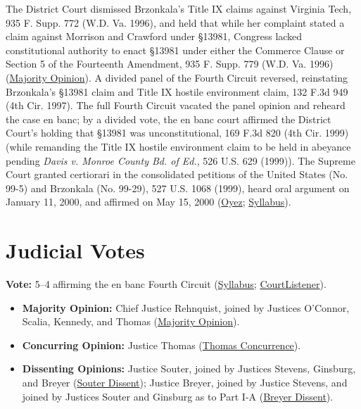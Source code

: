\documentclass[12pt]{article}
\begin{document}
The District Court dismissed Brzonkala's Title IX claims against Virginia Tech, 935 F. Supp. 772 (W.D. Va. 1996), and held that while her complaint stated a claim against Morrison and Crawford under \S 13981, Congress lacked constitutional authority to enact \S 13981 under either the Commerce Clause or Section 5 of the Fourteenth Amendment, 935 F. Supp. 779 (W.D. Va. 1996) (\href{https://www.law.cornell.edu/supct/html/99-5.ZO.html}{Majority Opinion}). A divided panel of the Fourth Circuit reversed, reinstating Brzonkala's \S 13981 claim and Title IX hostile environment claim, 132 F.3d 949 (4th Cir. 1997). The full Fourth Circuit vacated the panel opinion and reheard the case en banc; by a divided vote, the en banc court affirmed the District Court's holding that \S 13981 was unconstitutional, 169 F.3d 820 (4th Cir. 1999) (while remanding the Title IX hostile environment claim to be held in abeyance pending \textit{Davis v. Monroe County Bd. of Ed.}, 526 U.S. 629 (1999)). The Supreme Court granted certiorari in the consolidated petitions of the United States (No. 99-5) and Brzonkala (No. 99-29), 527 U.S. 1068 (1999), heard oral argument on January 11, 2000, and affirmed on May 15, 2000 (\href{https://www.oyez.org/cases/1999/99-5}{Oyez}; \href{https://www.law.cornell.edu/supct/html/99-5.ZS.html}{Syllabus}).

\section{Judicial Votes}
\textbf{Vote:} 5--4 affirming the en banc Fourth Circuit (\href{https://www.law.cornell.edu/supct/html/99-5.ZS.html}{Syllabus}; \href{https://www.courtlistener.com/opinion/118363/united-states-v-morrison/}{CourtListener}).
\begin{itemize}
\item \textbf{Majority Opinion:} Chief Justice Rehnquist, joined by Justices O'Connor, Scalia, Kennedy, and Thomas (\href{https://www.law.cornell.edu/supct/html/99-5.ZO.html}{Majority Opinion}).
\item \textbf{Concurring Opinion:} Justice Thomas (\href{https://www.law.cornell.edu/supct/html/99-5.ZC.html}{Thomas Concurrence}).
\item \textbf{Dissenting Opinions:} Justice Souter, joined by Justices Stevens, Ginsburg, and Breyer (\href{https://www.law.cornell.edu/supct/html/99-5.ZD.html}{Souter Dissent}); Justice Breyer, joined by Justice Stevens, and joined by Justices Souter and Ginsburg as to Part I-A (\href{https://www.law.cornell.edu/supct/html/99-5.ZD1.html}{Breyer Dissent}).
\end{itemize}
\end{document}
